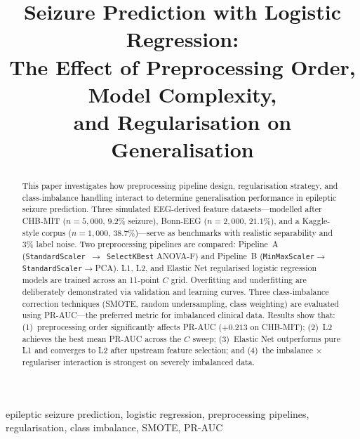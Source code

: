 \documentclass[conference]{IEEEtran}
\begin{document}
\title{Seizure Prediction with Logistic Regression:\\
  The Effect of Preprocessing Order, Model Complexity,\\
  and Regularisation on Generalisation}

\author{
}

\maketitle

\begin{abstract}\sloppy
This paper investigates how preprocessing pipeline design, regularisation
strategy, and class-imbalance handling interact to determine generalisation
performance in epileptic seizure prediction. Three simulated EEG-derived
feature datasets---modelled after CHB-MIT ($n{=}5{,}000$, $9.2\%$ seizure),
Bonn-EEG ($n{=}2{,}000$, $21.1\%$), and a Kaggle-style corpus
($n{=}1{,}000$, $38.7\%$)---serve as benchmarks with realistic separability
and $3\%$ label noise. Two preprocessing pipelines are compared: Pipeline~A
(\texttt{StandardScaler}~$\!\to\!$~\texttt{SelectKBest} ANOVA-F) and
Pipeline~B (\texttt{MinMaxScaler}$\to$\texttt{StandardScaler}$\to$PCA).
L1, L2, and Elastic Net regularised logistic regression models are trained
across an 11-point $C$ grid. Overfitting and underfitting are deliberately
demonstrated via validation and learning curves. Three class-imbalance
correction techniques (SMOTE, random undersampling, class weighting) are
evaluated using PR-AUC---the preferred metric for imbalanced clinical data.
Results show that: (1)~preprocessing order significantly affects PR-AUC
($+0.213$ on CHB-MIT); (2)~L2 achieves the best mean PR-AUC across the $C$
sweep; (3)~Elastic Net outperforms pure L1 and converges to L2 after
upstream feature selection; and (4)~the imbalance $\times$ regulariser
interaction is strongest on severely imbalanced data.
\end{abstract}

\begin{IEEEkeywords}
epileptic seizure prediction, logistic regression, preprocessing pipelines,
regularisation, class imbalance, SMOTE, PR-AUC
\end{IEEEkeywords}
\end{document}
